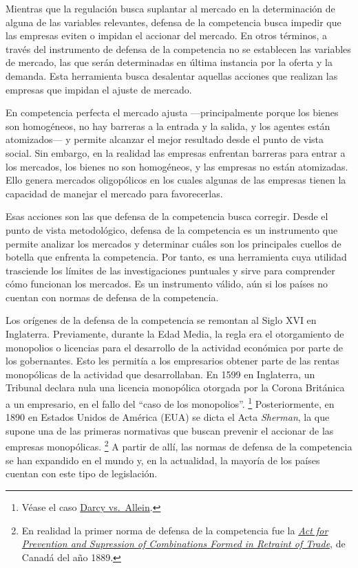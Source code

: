 \documentclass[
  12pt,
  spanish,
]{book}
\begin{document}
Mientras que la regulación busca suplantar al mercado en la
determinación de alguna de las variables relevantes, defensa de la
competencia busca impedir que las empresas eviten o impidan el accionar
del mercado. En otros términos, a través del instrumento de defensa de
la competencia no se establecen las variables de mercado, las que serán
determinadas en última instancia por la oferta y la demanda. Esta
herramienta busca desalentar aquellas acciones que realizan las empresas
que impidan el ajuste de mercado.

En competencia perfecta el mercado ajusta ---principalmente porque los
bienes son homogéneos, no hay barreras a la entrada y la salida, y los
agentes están atomizados--- y permite alcanzar el mejor resultado desde
el punto de vista social. Sin embargo, en la realidad las empresas
enfrentan barreras para entrar a los mercados, los bienes no son
homogéneos, y las empresas no están atomizadas. Ello genera mercados
oligopólicos en los cuales algunas de las empresas tienen la capacidad
de manejar el mercado para favorecerlas.

Esas acciones son las que defensa de la competencia busca corregir.
Desde el punto de vista metodológico, defensa de la competencia es un
instrumento que permite analizar los mercados y determinar cuáles son
los principales cuellos de botella que enfrenta la competencia. Por
tanto, es una herramienta cuya utilidad trasciende los límites de las
investigaciones puntuales y sirve para comprender cómo funcionan los
mercados. Es un instrumento válido, aún si los países no cuentan con
normas de defensa de la competencia.

Los orígenes de la defensa de la competencia se remontan al Siglo XVI en
Inglaterra. Previamente, durante la Edad Media, la regla era el
otorgamiento de monopolios o licencias para el desarrollo de la
actividad económica por parte de los gobernantes. Esto les permitía a
los empresarios obtener parte de las rentas monopólicas de la actividad
que desarrollaban. En 1599 en Inglaterra, un Tribunal declara nula una
licencia monopólica otorgada por la Corona Británica a un empresario, en
el fallo del ``caso de los monopolios''. \footnote{Véase el caso
  \href{https://en.wikipedia.org/wiki/Darcy_v_Allein}{Darcy vs.~Allein}.}
Posteriormente, en 1890 en Estados Unidos de América (EUA) se dicta el
Acta \emph{Sherman}, la que supone una de las primeras normativas que
buscan prevenir el accionar de las empresas monopólicas. \footnote{En
  realidad la primer norma de defensa de la competencia fue la
  \emph{\href{https://www.competitionbureau.gc.ca/eic/site/cb-bc.nsf/eng/04427.html}{Act
  for Prevention and Supression of Combinations Formed in Retraint of
  Trade}}, de Canadá del año 1889.} A partir de allí, las normas de
defensa de la competencia se han expandido en el mundo y, en la
actualidad, la mayoría de los países cuentan con este tipo de
legislación.
\end{document}
